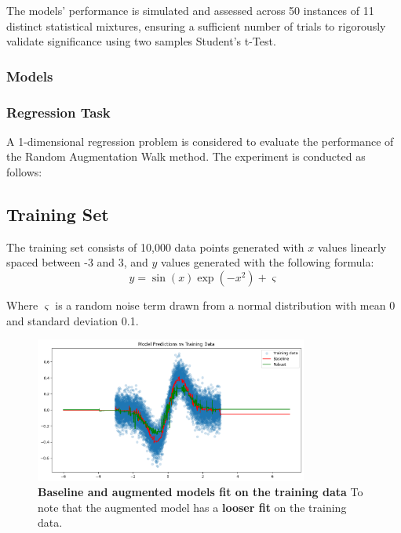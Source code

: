 The models' performance is simulated and assessed across 50 instances of 11 distinct statistical mixtures, ensuring a sufficient number of trials to rigorously validate significance using two samples Student's t-Test.

\subsubsection{Models}









\subsubsection{\textbf{Regression Task}}

A 1-dimensional regression problem is considered to evaluate the performance of the Random Augmentation Walk method. The experiment is conducted as follows:

\subsection{Training Set}
The training set consists of 10,000 data points generated with $x$ values linearly spaced between -3 and 3, and $y$ values generated with the following formula:
\begin{equation}
    y = \sin(x)\exp(-x^2) + \varsigma
\end{equation}

Where $\varsigma$ is a random noise term drawn from a normal distribution with mean 0 and standard deviation 0.1.

\begin{figure}[H]
    \centering
    \includegraphics[width=0.8\textwidth]{assets/fit_on_train.png} 
    \caption{\textbf{Baseline and augmented models fit on the training data} To note that the augmented model has a \textbf{looser fit} on the training data.}
    \label{fig:fit-train}
\end{figure}

